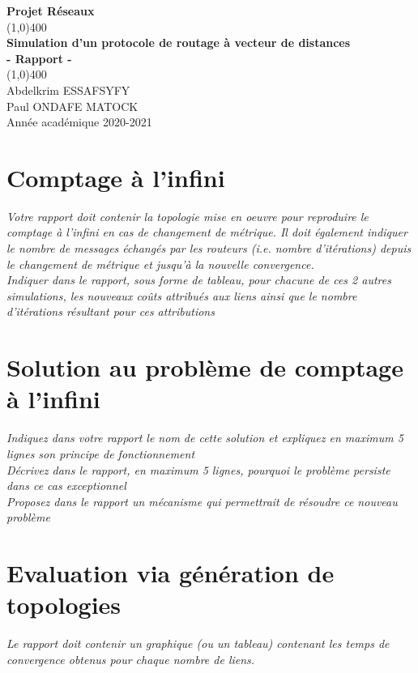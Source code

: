\documentclass[11pt]{article}
\begin{document}
\begin{titlepage}
\begin{center}
\vspace*{1cm}
\Large{\textbf{Projet Réseaux}}\\
\vfill
\line(1,0){400}\\[1mm]
\huge{\textbf{Simulation d'un protocole de routage à vecteur de distances}}\\[3mm]
\Large{\textbf{- Rapport -}}\\[1mm]
\line(1,0){400}\\
\vfill
Abdelkrim ESSAFSYFY\\
Paul ONDAFE MATOCK\\
Année académique 2020-2021
\end{center}
\end{titlepage}

\tableofcontents
\thispagestyle{empty}
\clearpage
\setcounter{page}{1}

\section{Comptage à l'infini}
\textit{Votre rapport doit contenir la topologie mise en oeuvre pour reproduire le comptage à l’infini en cas de changement de métrique. Il doit également indiquer le nombre de messages échangés par les routeurs (i.e. nombre d’itérations) depuis le changement de métrique et jusqu’à la nouvelle convergence.}\\

\textit{Indiquer dans le rapport, sous forme de tableau, pour chacune de ces 2 autres simulations, les nouveaux coûts attribués aux liens ainsi que le nombre d’itérations résultant pour ces attributions}

\section{Solution au problème de comptage à l’infini}
\textit{Indiquez dans votre rapport le nom de cette solution et expliquez en maximum 5 lignes son principe de fonctionnement}\\

\textit{Décrivez dans le rapport, en maximum 5 lignes, pourquoi le problème persiste dans ce cas
exceptionnel}\\

\textit{Proposez dans le rapport un mécanisme qui permettrait de résoudre ce nouveau
problème}

\section{Evaluation via génération de topologies}
\textit{Le rapport doit contenir un graphique (ou un tableau) contenant les temps de convergence obtenus
pour chaque nombre de liens.}

\vspace{10px}
\begin{center}
\end{center}

\vspace*{\fill}
\end{document}
